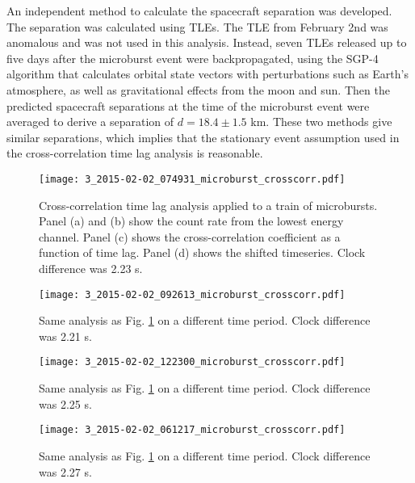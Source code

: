 An independent method to calculate the spacecraft separation was developed. The separation was calculated using TLEs. The TLE from February 2nd was anomalous and was not used in this analysis. Instead, seven TLEs released up to five days after the microburst event were backpropagated, using the SGP-4 algorithm \citep{sgp4} that calculates orbital state vectors with perturbations such as Earth's atmosphere, as well as gravitational effects from the moon and sun. Then the predicted spacecraft separations at the time of the microburst event were averaged to derive a separation of $d = 18.4 \pm 1.5$ km. These two methods give similar separations, which implies that the stationary event assumption used in the cross-correlation time lag analysis is reasonable.

\clearpage

\begin{figure}
\noindent\texttt{[image: 3\_2015-02-02\_074931\_microburst\_crosscorr.pdf]}
\caption{Cross-correlation time lag analysis applied to a train of microbursts. Panel (a) and (b) show the count rate from the lowest energy channel. Panel (c) shows the cross-correlation coefficient as a function of time lag. Panel (d) shows the shifted timeseries. Clock difference was 2.23 s.}
\label{figure_S1}
\end{figure}

\begin{figure}
\noindent\texttt{[image: 3\_2015-02-02\_092613\_microburst\_crosscorr.pdf]}
\caption{Same analysis as Fig. \ref{figure_S1} on a different time period. Clock difference was 2.21 s.}
\label{figure_S2}
\end{figure}

\begin{figure}
\noindent\texttt{[image: 3\_2015-02-02\_122300\_microburst\_crosscorr.pdf]}
\caption{Same analysis as Fig. \ref{figure_S1} on a different time period. Clock difference was 2.25 s.}
\label{figure_S3}
\end{figure}

\begin{figure}
\noindent\texttt{[image: 3\_2015-02-02\_061217\_microburst\_crosscorr.pdf]}
\caption{Same analysis as Fig. \ref{figure_S1} on a different time period. Clock difference was 2.27 s.}
\label{figure_S4}
\end{figure}

